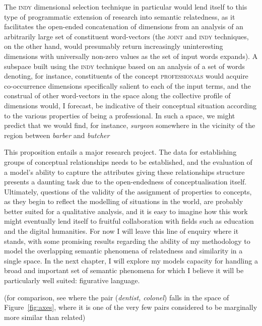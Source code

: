 The \textsc{indy} dimensional selection technique in particular would lend itself to this type of programmatic extension of research into semantic relatedness, as it facilitates the open-ended concatenation of dimensions from an analysis of an arbitrarily large set of constituent word-vectors (the \textsc{joint} and \textsc{indy} techniques, on the other hand, would presumably return increasingly uninteresting dimensions with universally non-zero values as the set of input words expands).  A subspace built using the \textsc{indy} technique based on an analysis of a set of words denoting, for instance, constituents of the concept \textsc{professionals} would acquire co-occurrence dimensions specifically salient to each of the input terms, and the construal of other word-vectors in the space along the collective profile of dimensions would, I forecast, be indicative of their conceptual situation according to the various properties of being a professional.  In such a space, we might predict that we would find, for instance, \emph{surgeon} somewhere in the vicinity of the region between \emph{barber} and \emph{butcher}

This proposition entails a major research project.  The data for establishing groups of conceptual relationships needs to be established, and the evaluation of a model's ability to capture the attributes giving these relationships structure presents a daunting task due to the open-endedness of conceptualisation itself.  Ultimately, questions of the validity of the assignment of properties to concepts, as they begin to reflect the modelling of situations in the world, are probably better suited for a qualitative analysis, and it is easy to imagine how this work might eventually lend itself to fruitful collaboration with fields such as education and the digital humanities.  For now I will leave this line of enquiry where it stands, with some promising results regarding the ability of my methodology to model the overlapping semantic phenomena of relatedness and similarity in a single space.  In the next chapter, I will explore my models capacity for handling a broad and important set of semantic phenomena for which I believe it will be particularly well suited: figurative language.

(for comparison, see where the pair (\emph{dentist, colonel}) falls in the space of Figure~\ref{fig:axes}, where it is one of the very few pairs considered to be marginally more similar than related)
